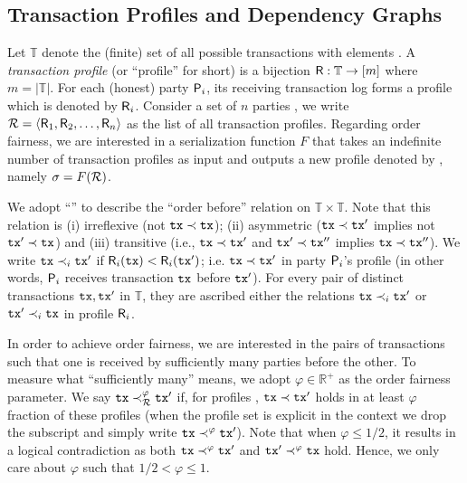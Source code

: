 \subsection{Transaction Profiles and Dependency Graphs}
\label{subsec:transaction-profiles-dependency-graphs}

Let $\mathbb{T}$ denote the (finite) set of all possible transactions with elements \tx.
%
A \emph{transaction profile} (or ``profile'' for short) is a bijection $\mathsf{R} : \mathbb{T} \rightarrow [m]$ where $m = |\mathbb{T}|$.
%
For each (honest) party $\mathsf{P}_i$, its receiving transaction log forms a profile which is denoted by $\mathsf{R}_i$.
%
Consider a set of $n$ parties \partyset, we write $\mathcal{R} = \langle \mathsf{R}_1, \mathsf{R}_2, \ldots, \mathsf{R}_n \rangle$ as the list of all transaction profiles.
%
Regarding order fairness, we are interested in a serialization function $F$ that takes an indefinite number of transaction profiles \profileSet as input and outputs a new profile denoted by \orderOutput, namely $\sigma = F(\mathcal{R})$.

We adopt ``\before'' to describe the ``order before'' relation on $\mathbb{T} \times \mathbb{T}$.
%
Note that this relation is (i) irreflexive (not $\mathtt{tx} \prec \mathtt{tx}$); (ii) asymmetric ($\mathtt{tx} \prec \mathtt{tx}'$ implies not $\mathtt{tx}' \prec \mathtt{tx}$) and (iii) transitive (i.e., $\mathtt{tx} \prec \mathtt{tx}'$ and $\mathtt{tx}' \prec \mathtt{tx}''$ implies $\mathtt{tx} \prec \mathtt{tx}''$).
%
We write $\mathtt{tx} \prec_i \mathtt{tx}'$ if $\mathsf{R}_i(\mathtt{tx}) < \mathsf{R}_i(\mathtt{tx}')$; i.e. $\mathtt{tx} \prec \mathtt{tx}'$ in party $\mathsf{P}_i$'s profile (in other words, $\mathsf{P}_i$ receives transaction $\mathtt{tx}$ before $\mathtt{tx}'$).
%
For every pair of distinct transactions $\mathtt{tx}, \mathtt{tx}'$ in $\mathbb{T}$, they are ascribed either the relations $\mathtt{tx} \prec_i \mathtt{tx}'$ or $\mathtt{tx}' \prec_i \mathtt{tx}$ in profile $\mathsf{R}_i$.

In order to achieve order fairness, we are interested in the pairs of transactions such that one is received by sufficiently many parties before the other.
%
To measure what ``sufficiently many'' means, we adopt $\varphi \in \mathbb{R}^+$ as the order fairness parameter.
%
We say $\mathtt{tx} \prec^\varphi_\mathcal{R} \mathtt{tx}'$ if, for profiles \profileSet, $\mathtt{tx} \prec \mathtt{tx}'$ holds in at least $\varphi$ fraction of these profiles (when the profile set is explicit in the context we drop the subscript and simply write $\mathtt{tx} \prec^\varphi \mathtt{tx}'$).
%
Note that when $\varphi \le 1 / 2$, it results in a logical contradiction as both $\mathtt{tx} \prec^\varphi \mathtt{tx}'$ and $\mathtt{tx}' \prec^\varphi \mathtt{tx}$ hold.
%
Hence, we only care about $\varphi$ such that $1 / 2 < \varphi \le 1$.

